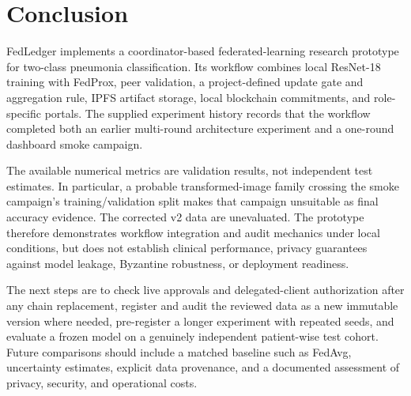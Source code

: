 \documentclass[12pt,a4paper]{report}
\begin{document}
\chapter{Conclusion}
FedLedger implements a coordinator-based federated-learning research prototype for two-class pneumonia classification. Its workflow combines local ResNet-18 training with FedProx, peer validation, a project-defined update gate and aggregation rule, IPFS artifact storage, local blockchain commitments, and role-specific portals. The supplied experiment history records that the workflow completed both an earlier multi-round architecture experiment and a one-round dashboard smoke campaign.

The available numerical metrics are validation results, not independent test estimates. In particular, a probable transformed-image family crossing the smoke campaign's training/validation split makes that campaign unsuitable as final accuracy evidence. The corrected v2 data are unevaluated. The prototype therefore demonstrates workflow integration and audit mechanics under local conditions, but does not establish clinical performance, privacy guarantees against model leakage, Byzantine robustness, or deployment readiness.

The next steps are to check live approvals and delegated-client authorization after any chain replacement, register and audit the reviewed data as a new immutable version where needed, pre-register a longer experiment with repeated seeds, and evaluate a frozen model on a genuinely independent patient-wise test cohort. Future comparisons should include a matched baseline such as FedAvg, uncertainty estimates, explicit data provenance, and a documented assessment of privacy, security, and operational costs.
\end{document}
